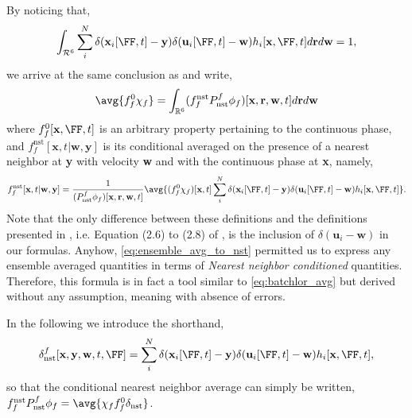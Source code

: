 By noticing that, 
\begin{equation}
    \int_{\mathcal{R}^6}
    \sum_i^N 
    \delta(\textbf{x}_i[\FF,t]-\textbf{y})
    \delta(\textbf{u}_i[\FF,t]-\textbf{w})
    h_i[\textbf{x},\FF,t]
    d\textbf{r}
    d\textbf{w} 
    =1,
\end{equation}
we arrive at the same conclusion as \citet{zhang2021ensemble} and write, 
\begin{equation}
    \avg{f_f^0\chi_f}
    = 
    \int_{\mathbb{R}^6}
    (f_f^\text{nst}P_\text{nst}^f\phi_f)[\textbf{x},\textbf{r},\textbf{w},t]
    d\textbf{r}
    d\textbf{w}
    \label{eq:ensemble_avg_to_nst}
\end{equation} 
where $f_f^0[\textbf{x},\FF,t]$ is an arbitrary property pertaining to the continuous phase, and $f_f^\text{nst}[\textbf{x},t|\textbf{w},\textbf{y}]$ is its conditional averaged on the presence of a nearest neighbor at \textbf{y} with velocity \textbf{w} and with the continuous phase at \textbf{x}, namely, 
\begin{equation}
    f_f^\text{nst}[\textbf{x},t|\textbf{w},\textbf{y}]
    =\frac{1}{(P_\text{nst}^f\phi_f) [\textbf{x},\textbf{r},\textbf{w},t]}
    \avg{
        (f_f^0
        \chi_f)[\textbf{x},t]
        \sum_i^N 
        \delta(\textbf{x}_i[\FF,t]-\textbf{y})
        \delta(\textbf{u}_i[\FF,t]-\textbf{w})
        h_i[\textbf{x},\FF,t]
    }.
    \label{eq:def_f_nst}
\end{equation}
Note that the only difference between these definitions and the definitions presented in \citet{zhang2021ensemble}, i.e. Equation (2.6) to (2.8) of \citet{zhang2021ensemble}, is the inclusion of $\delta(\textbf{u}_i - \textbf{w})$ in our formulas. 
Anyhow, \ref{eq:ensemble_avg_to_nst} permitted us to express any ensemble averaged quantities in terms of \textit{Nearest neighbor conditioned} quantities. 
Therefore, this formula is in fact a tool similar to \ref{eq:batchlor_avg} but derived without any assumption, meaning with absence of errors. 

In the following we introduce the shorthand, 
\begin{equation*}
    \delta_\text{nst}^f [\textbf{x},\textbf{y},\textbf{w},t,\FF]
    =
    \sum_i^N 
    \delta(\textbf{x}_i[\FF,t]-\textbf{y})
    \delta(\textbf{u}_i[\FF,t]-\textbf{w})
    h_i[\textbf{x},\FF,t],
\end{equation*}
so that the conditional nearest neighbor average can simply be written, $f_f^\text{nst} P_\text{nst}^f \phi_f = \avg{\chi_f f_f^0 \delta_\text{nst}}$.

